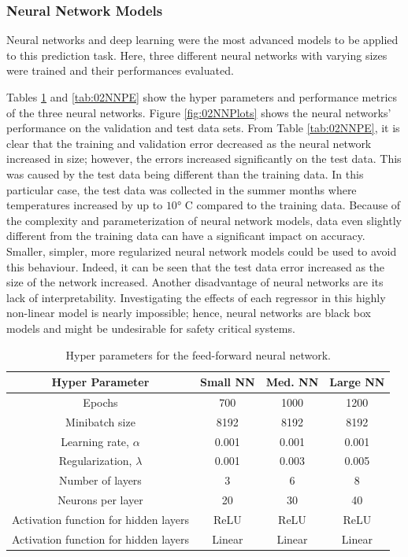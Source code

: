 \subsubsection{Neural Network Models}
Neural networks and deep learning were the most advanced models to be applied to this prediction task.  Here, three different neural networks with varying sizes were trained and their performances evaluated. 

Tables \ref{tab:02NNHP} and \ref{tab:02NNPE} show the hyper parameters and performance metrics of the three neural networks.  Figure \ref{fig:02NNPlots} shows the neural networks' performance on the validation and test data sets.  From Table \ref{tab:02NNPE}, it is clear that the training and validation error decreased as the neural network increased in size; however, the errors increased significantly on the test data. This was caused by the test data being different than the training data.  In this particular case, the test data was collected in the summer months where temperatures increased by up to $\ang{10}$ C compared to the training data.  Because of the complexity and parameterization of neural network models, data even slightly different from the training data can have a significant impact on accuracy.  Smaller, simpler, more regularized neural network models could be used to avoid this behaviour. Indeed, it can be seen that the test data error increased as the size of the network increased. Another disadvantage of neural networks are its lack of interpretability.  Investigating the effects of each regressor in this highly non-linear model is nearly impossible; hence, neural networks are black box models and might be undesirable for safety critical systems.
\begin{table}[h]
    \centering
    {
    \begin{tabular}{ c | c | c | c}
        Hyper Parameter                            &  Small NN  &  Med. NN  & Large NN       \\
        \hline
        Epochs                                     &  700       & 1000      & 1200  \\
        Minibatch size                             &  8192      & 8192      & 8192  \\
        Learning rate, $\alpha$                    &  0.001     & 0.001     & 0.001 \\
        Regularization, $\lambda$                  &  0.001     & 0.003     & 0.005 \\
        Number of layers                           &  3         & 6         & 8     \\
        Neurons per layer                          &  20        & 30        & 40    \\
        Activation function for hidden layers      & ReLU       & ReLU      & ReLU  \\
        Activation function for hidden layers      & Linear     & Linear    & Linear \\
    \end{tabular}}
    \caption{Hyper parameters for the feed-forward neural network.}
    \label{tab:02NNHP}
\end{table}

